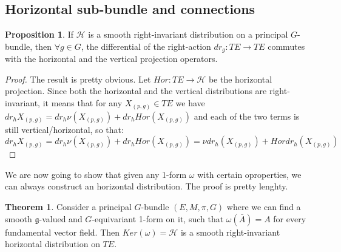 \documentclass[12pt,a4paper]{report}
\theoremstyle{definition}
\theoremstyle{Theorem}
\newtheorem{Theo}[Def]{Theorem}
\newtheorem{Prop}[Def]{Proposition}
\theoremstyle{definition}
\theoremstyle{definition}
\begin{document}
		\subsection{Horizontal sub-bundle and connections}
		\begin{Prop}
			If $\mathcal{H}$ is a smooth right-invariant distribution on a principal $G$-bundle, then $\forall g\in G$, the differential of the right-action $dr_g:TE\rightarrow TE$ commutes with the horizontal and the vertical projection operators.
		\end{Prop}
		\begin{proof}
			The result is pretty obvious. Let $Hor:TE\rightarrow\mathcal{H}$ be the horizontal projection. Since both the horizontal and the vertical distributions are right-invariant, it means that for any $X_{(p,g)}\in TE$ we have $dr_h X_{(p,g)}=dr_h \nu(X_{(p,g)})+dr_hHor(X_{(p,g)})$ and each of the two terms is still vertical/horizontal, so that:
			$$dr_h X_{(p,g)}=dr_h \nu(X_{(p,g)})+dr_hHor(X_{(p,g)})=
			\nu dr_h(X_{(p,g)})+Hordr_h(X_{(p,g)})$$
		\end{proof}
		We are now going to show that given any 1-form $\omega$ with certain oproperties, we can always construct an horizontal distribution. The proof is pretty lenghty.
		\begin{Theo}
			Consider a principal $G$-bundle $(E,M,\pi,G)$ where we can find a smooth $\mathfrak{g}$-valued and $G$-equivariant 1-form on it, such that $\omega(\bar{A})=A$ for every fundamental vector field. Then $Ker(\omega)=\mathcal{H}$ is a smooth right-invariant horizontal distribution on $TE$.
		\end{Theo}
\end{document}
